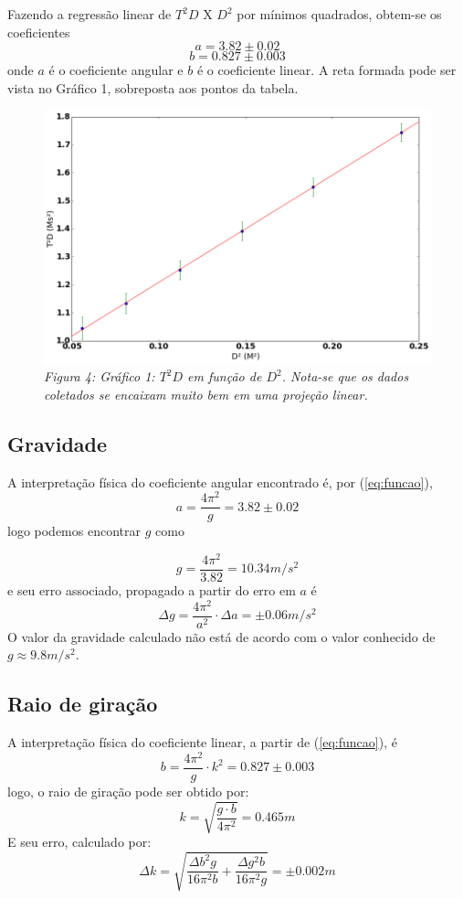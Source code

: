 \documentclass[12pt,a4paper]{article}
\begin{document}
Fazendo a regressão linear de $T^2D$ X $D^2$ por mínimos quadrados, obtem-se os coeficientes 
$$ a = 3.82 \pm 0.02 $$ 
 $$ b = 0.827 \pm 0.003 $$
onde $a$ é o coeficiente angular e $b$ é o coeficiente linear. A reta formada pode ser vista no Gráfico 1, sobreposta aos pontos da tabela.

\begin{figure}[!hbtbp]

\includegraphics[scale=0.55]{index.png} 
\emph{Figura 4: Gráfico 1: $T^2D$ em função de $D^2$. Nota-se que os dados coletados se encaixam muito bem em uma projeção linear.}

\label{fig:Grafico}
\end{figure}
\subsection{Gravidade}
A interpretação física do coeficiente angular encontrado é, por (\ref{eq:funcao}),
 $$ a = \frac{4\pi^2}{g} = 3.82 \pm 0.02$$
  logo podemos encontrar $g$ como 

  $$ g = \frac{4\pi^2}{3.82} = 10.34 m/s^2 $$ 
  e seu erro associado, propagado a partir do erro em $a$ é
  $$ \Delta g = \frac{4\pi^2}{a^2} \cdot \Delta a = \pm 0.06 m/s^2 $$
  O valor da gravidade calculado não está de acordo com o valor conhecido de $g \approx 9.8m/s^2$.

\subsection{Raio de giração}

A interpretação física do coeficiente linear, a partir de (\ref{eq:funcao}), é 
$$ b = \frac{4\pi^2}{g} \cdot k^2 = 0.827 \pm 0.003 $$
logo, o raio de giração pode ser obtido por:
$$ k = \sqrt{\frac{g \cdot b}{4\pi^2}} = 0.465 m $$
E seu erro, calculado por:
$$ \Delta k =
\sqrt{\frac{\Delta b^{2} g}{16 \pi^{2} b} + \frac{\Delta g^{2} b}{16 \pi^{2} g}} 
 =  \pm 0.002  m$$
\end{document}
